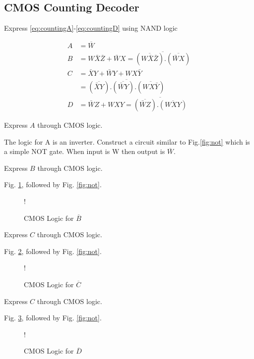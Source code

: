 \documentclass[journal,12pt,twocolumn]{IEEEtran}
\begin{document}
\subsection{CMOS Counting Decoder}
\begin{problem}
Express \eqref{eq:countingA}-\eqref{eq:countingD} using NAND logic
\end{problem}
\solution
\begin{align}
A&=\overline{W}
\\
B&=W\bar{X}\bar{Z}+\bar{W}X =\overline{(\overline{W\bar{X}\bar{Z}}).(\overline{\bar{W}X})}
\\
C&=\bar{X}Y+\bar{W}Y+WX\bar{Y}
\\
&=\overline{(\overline{\bar{X}Y}).(\overline{\bar{W}Y}).(\overline{WX\bar{Y}})}
\\
D&=\bar{W}Z+WXY=\overline{(\overline{\bar{W}Z}).(\overline{WXY})}
\end{align}
\begin{problem}
Express $A$ through CMOS logic.
\end{problem}
\solution
The logic for A is an inverter. Construct a circuit similar to Fig.\ref{fig:not} which is a simple NOT gate.
When input is W then output is $\overline{W}$.
\begin{problem}
Express $B$ through CMOS logic.
\end{problem}
\solution Fig. \ref{fig:CMOS_B}, followed by Fig. \ref{fig:not}.
\begin{figure}[!h]
\centering
\resizebox {\columnwidth} {!} {

}
\caption{CMOS Logic for $\overline{B}$}
\label{fig:CMOS_B}
\end{figure}
\begin{problem}
Express $C$ through CMOS logic.
\end{problem}
\solution Fig. \ref{fig:CMOS_C}, followed by Fig. \ref{fig:not}.
\begin{figure}[!h]
\centering
\resizebox {\columnwidth} {!} {

}
\caption{CMOS Logic for $\overline{C}$}
\label{fig:CMOS_C}
\end{figure}
\begin{problem}
Express $C$ through CMOS logic.
\end{problem}
\solution Fig. \ref{fig:CMOS_D}, followed by Fig. \ref{fig:not}.

\begin{figure}[!h]
\centering
\resizebox {\columnwidth} {!} {

}
\caption{CMOS Logic for $\overline{D}$}
\label{fig:CMOS_D}
\end{figure}
\end{document}

